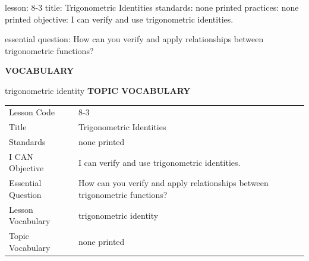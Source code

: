 \documentclass{article}
\newenvironment{lesson-meta}{}{}        %
\newcommand{\te}[1]{}                   %
\begin{document}
\begin{lesson-meta}
lesson: 8-3
title: Trigonometric Identities
standards: none printed
practices: none printed
objective: I can verify and use trigonometric identities.

essential question: How can you verify and apply relationships between trigonometric functions?

\textbf{VOCABULARY}
\item trigonometric identity
\textbf{TOPIC VOCABULARY}
\te{No topic vocabulary list is printed on these pages.}
\begin{tabular}{ll}
Lesson Code & 8-3 \\
Title & Trigonometric Identities \\
Standards & none printed \\
I CAN Objective & I can verify and use trigonometric identities. \\
Essential Question & How can you verify and apply relationships between trigonometric functions? \\
Lesson Vocabulary & trigonometric identity \\
Topic Vocabulary & none printed \\
\end{tabular}
\end{lesson-meta}
\end{document}
